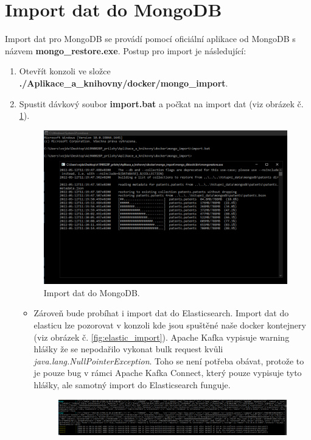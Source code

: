 \section{Import dat do MongoDB}
Import dat pro MongoDB se provádí pomocí oficiální aplikace od MongoDB s názvem \textbf{mongo\_restore.exe}. Postup pro import je následující:
\begin{enumerate}
\item Otevřít konzoli ve složce \textbf{./Aplikace\_a\_knihovny/docker/mongo\_import}.
\item Spustit dávkový soubor \textbf{import.bat} a počkat na import dat (viz obrázek č. \ref{fig:mongo_import}).
	\begin{figure}[H]
	\centering
	\includegraphics[width=14cm]{img/manual/mongo_import}
	\caption{Import dat do MongoDB.}
	\label{fig:mongo_import}
	\end{figure}
	\begin{itemize}
	\item Zároveň bude probíhat i import dat do Elasticsearch. Import dat do elasticu lze pozorovat v konzoli kde jsou spuštěné naše docker kontejnery (viz obrázek č. \ref{fig:elastic_import}). Apache Kafka vypisuje warning hlášky že se nepodařilo vykonat bulk request kvůli \newline\textit{java.lang.NullPointerException}. Toho se není potřeba obávat, protože to je pouze bug v rámci Apache Kafka Connect, který pouze vypisuje tyto hlášky, ale samotný import do Elasticsearch funguje.
		\begin{figure}[H]
		\centering
		\includegraphics[width=14cm]{img/manual/mongo_import_console}

\end{figure}
\end{itemize}
\end{enumerate}

